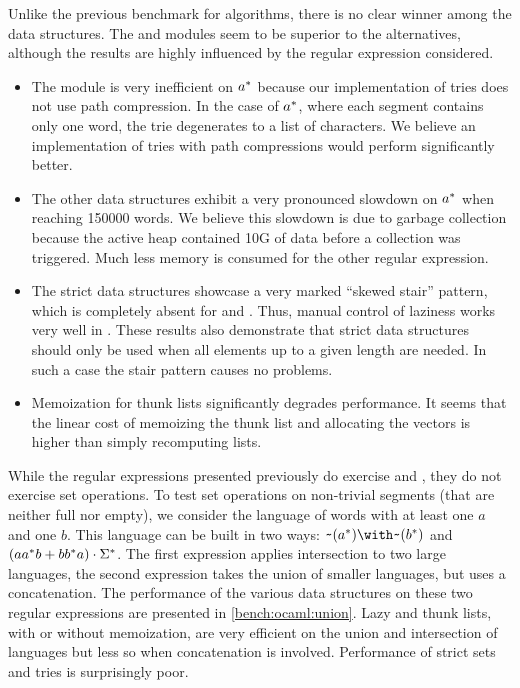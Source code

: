 Unlike the previous benchmark for algorithms, there is no clear winner
among the data structures. The  and  modules seem to
be superior to the alternatives, although the results are highly influenced by
the regular expression considered.
\begin{itemize}[leftmargin=*]
\item The  module is very inefficient on $a^*$ because
  our implementation of tries does not use path compression.
  In the case of $a^*$, where each segment contains only one word, the
  trie degenerates to a list of characters.
  We believe
  an implementation of tries with path compressions would perform significantly better.
\item The other data structures exhibit a very pronounced slowdown on $a^*$
  when reaching 150000 words.
  We believe this slowdown is due to garbage collection because
  the active heap contained 10G of data before
  a collection was triggered. Much less memory is consumed for the other regular
  expression.
\item The strict data structures showcase a very marked ``skewed
  stair'' pattern, which is completely absent for  and
  . Thus, manual control of laziness works very well in
  \ocaml. These results also demonstrate that strict data structures
  should only be used when all elements up to a given length are
  needed. In such a case the stair pattern causes no problems.
\item Memoization for thunk lists significantly degrades performance. It seems
  that the linear cost of memoizing the thunk list and allocating the vectors
  is higher than simply recomputing lists.
\end{itemize}

While the regular expressions presented previously do exercise
 and , they do not exercise set
operations.  To test set operations on non-trivial segments (that are
neither full nor empty), we consider the language of words with at
least one $a$ and one $b$. This language can be built in two ways:
$\Rintersect{\Rcomplement{(\Rstar{a})}}{\Rcomplement{(\Rstar{b})}}$
and $(aa^*b +{bb^*a}) \cdot{\Sigma^*}$.
The first expression applies {intersection} to two large languages,
the second expression takes the union of smaller languages, but uses a
concatenation.  The performance of the various data structures on
these two regular expressions are presented in
\cref{bench:ocaml:union}.  Lazy and thunk lists, with or without
memoization, are very efficient on the union and intersection of
languages but less so when concatenation is involved. Performance of
strict sets and tries is surprisingly poor.

